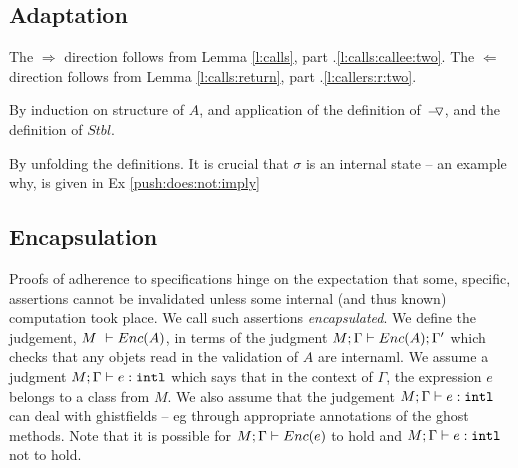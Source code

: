 \completeProof

\subsection{Adaptation}

 


The $\Longrightarrow$ direction follows from Lemma \ref{l:calls}, part .\ref{l:calls:callee:two}.
The $\Longleftarrow$ direction follows from Lemma \ref{l:calls:return}, part .\ref{l:callers:r:two}.

% 
% 
%
\completeProof


By induction on structure of $A$, and application of  the definition of $ { } \!-\!\!\!\,\!{\triangledown} { } $, and the definition of $Stbl$.
\completeProof

By unfolding the definitions. It is crucial that $\sigma$ is an internal state -- an example why, is given in Ex \ref{push:does:not:imply}
\endProof


\subsection{Encapsulation}

{
Proofs of adherence to {\SpecLang specifications  hinge on the expectation that some, 
specific, assertions cannot be invalidated unless some 
} internal (and thus known) computation took place. 
{We call such assertions   \emph{encapsulated}.}
}
We define the  judgement,  $M\ \vdash  {\ensuremath Enc( A )}$, in terms of the judgment  $M; \Gamma \vdash {\ensuremath Enc( A )}  ; \Gamma'$
which checks that any objets read  in the validation of $A$ are internaml.
We assume a judgment $M; \Gamma \vdash e :  \mbox{\normalfont{\texttt{intl}}}$ which says that in the context of $\Gamma$, the expression $e$ belongs to a class from $M$.
We also assume that the judgement $M; \Gamma \vdash e :  \mbox{\normalfont{\texttt{intl}}}$ can deal with ghistfields -- eg through appropriate annotations of the ghost methods.
Note that it is possible for $M; \Gamma \vdash {\ensuremath Enc( e )}$ to hold and 
$M; \Gamma \vdash  e : \mbox{\normalfont{\texttt{intl}}}$ not to hold.


